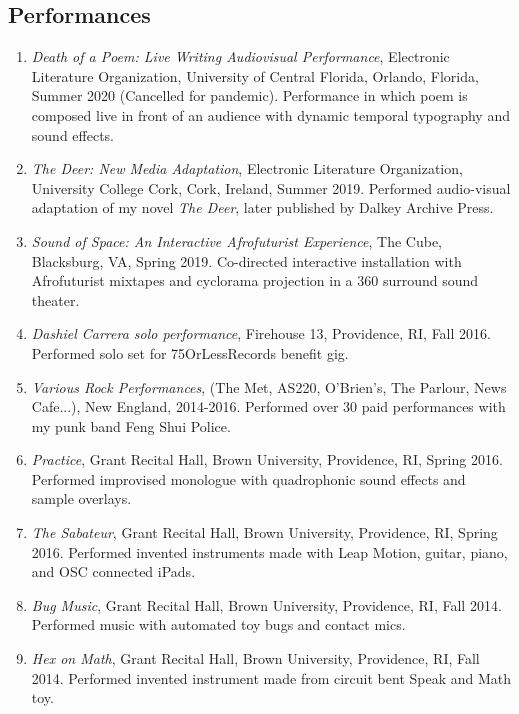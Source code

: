  \subsection{Performances}
 \begin{enumerate}
 \item \emph{Death of a Poem: Live Writing Audiovisual Performance}, Electronic Literature Organization, University of Central Florida, Orlando, Florida, Summer 2020 (Cancelled for pandemic). \subitem Performance in which poem is composed live in front of an audience with dynamic temporal typography and sound effects.\\
 \item \emph{The Deer: New Media Adaptation}, Electronic Literature Organization, University College Cork, Cork, Ireland, Summer 2019. \subitem Performed audio-visual adaptation of my novel \emph{The Deer}, later published by Dalkey Archive Press. \\
 \item \emph{Sound of Space: An Interactive Afrofuturist Experience}, The Cube, Blacksburg, VA, Spring 2019. \subitem Co-directed interactive installation with Afrofuturist mixtapes and cyclorama projection in a 360 surround sound theater.  \\
 \item \emph{Dashiel Carrera solo performance}, Firehouse 13, Providence, RI, Fall 2016. \subitem Performed solo set for 75OrLessRecords benefit gig.\\
 \item \emph{Various Rock Performances}, (The Met, AS220, O'Brien's, The Parlour, News Cafe...), New England, 2014-2016. \subitem Performed over 30 paid performances with my punk band Feng Shui Police.\\
 \item \emph{Practice}, Grant Recital Hall, Brown University, Providence, RI, Spring 2016. \subitem Performed improvised monologue with quadrophonic sound effects and sample overlays.\\
 \item \emph{The Sabateur}, Grant Recital Hall, Brown University, Providence, RI, Spring 2016. \subitem Performed invented instruments made with Leap Motion, guitar, piano, and OSC connected iPads.\\
 \item \emph{Bug Music}, Grant Recital Hall, Brown University, Providence, RI, Fall 2014. \subitem Performed music with automated toy bugs and contact mics.\\
 \item \emph{Hex on Math}, Grant Recital Hall, Brown University, Providence, RI, \hfill Fall 2014.
\subitem Performed invented instrument made from circuit bent Speak and Math toy. \\
\end{enumerate}
